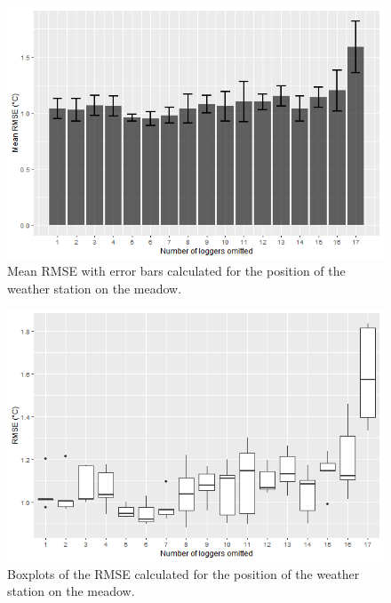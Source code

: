 \documentclass[5p]{elsarticle} %
\begin{document}
\begin{figure}[!ht]
\begin{center}
\includegraphics[scale=0.48]{rmse_wiese_mean_barplot}
\caption{Mean RMSE with error bars calculated for the position of the weather station on the meadow.}
\end{center}
\end{figure}

\begin{figure}[!h]
\begin{center}

\includegraphics[scale = 0.48]{rmse_wiese_boxplot}
\caption{Boxplots of the RMSE calculated for the position of the weather station on the meadow.
}
\end{center}
\end{figure}
\end{document}
